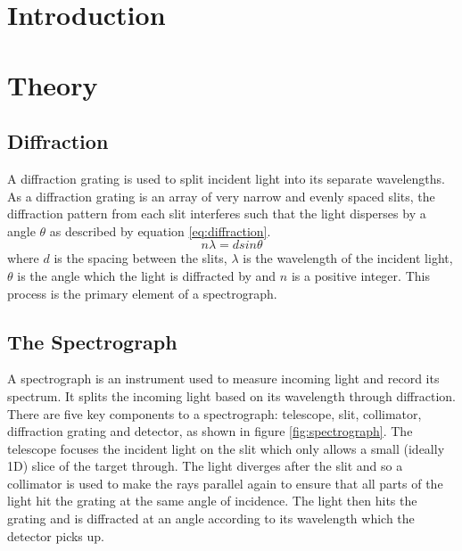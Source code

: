 \documentclass[a4paper,12pt,twocolumn]{article}
\let\cite=\supercite
\begin{document}
	\section{Introduction}
	
	\section{Theory}
		\subsection{Diffraction}
			A diffraction grating is used to split incident light into its separate wavelengths. As a diffraction grating is an array of very narrow and evenly spaced slits, the diffraction pattern from each slit interferes such that the light disperses by a angle $\theta$ as described by equation \ref{eq:diffraction}\cite{universityPhysics}.
			\begin{equation}
				n \lambda = d sin\theta
				\label{eq:diffraction}
			\end{equation} where $d$ is the spacing between the slits, 	$\lambda$ is the wavelength of the incident light, $\theta$ is the angle which the light is diffracted by and $n$ is a positive integer. This process is the primary element of a spectrograph.\\
		
		\subsection{The Spectrograph}	
			A spectrograph is an instrument used to measure incoming light and record its spectrum\cite{atnf}. It splits the incoming light based on its wavelength through diffraction. There are five key components to a spectrograph: telescope, slit, collimator, diffraction grating and detector, as shown in figure \ref{fig:spectrograph}. The telescope focuses the incident light on the slit which only allows a small (ideally 1D) slice of the target through\cite{manual}. The light diverges after the slit and so a collimator is used to make the rays parallel again to ensure that all parts of the light hit the grating at the same angle of incidence. The light then hits the grating and is diffracted at an angle according to its wavelength which the detector picks up.
		
\end{document}
